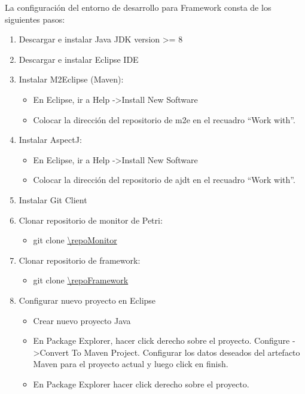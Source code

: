 La configuración del entorno de desarrollo para \nombreFramework
Framework consta de los siguientes pasos:

\begin{enumerate}
    \item Descargar e instalar Java JDK version \textgreater= 8
    \item Descargar e instalar Eclipse IDE 
    \item Instalar M2Eclipse (Maven):
        \begin{itemize}
            \item En Eclipse, ir a Help -\textgreater Install New Software
        \item Colocar la dirección del repositorio de m2e en el recuadro “Work
              with”.
        \end{itemize}
    \item Instalar AspectJ:
        \begin{itemize}
            \item En Eclipse, ir a Help -\textgreater Install New Software
            \item Colocar la dirección del repositorio de ajdt en el recuadro
            “Work with”.
        \end{itemize}
   \item Instalar Git Client
   \item Clonar repositorio de monitor de Petri:
        \begin{itemize}
          \item git clone \url{\repoMonitor}
        \end{itemize}
   \item Clonar repositorio de \nombreFramework framework:
        \begin{itemize}
          \item git clone \url{\repoFramework}
        \end{itemize}
   \item Configurar nuevo proyecto en Eclipse
        \begin{itemize}
          \item Crear nuevo proyecto Java
          \item En Package Explorer, hacer click derecho sobre el proyecto.
          Configure -\textgreater  Convert To Maven Project. Configurar los
          datos deseados del artefacto Maven para el proyecto actual y luego click en finish.
          \item En Package Explorer hacer click derecho sobre el proyecto.

\end{itemize}
\end{enumerate}
